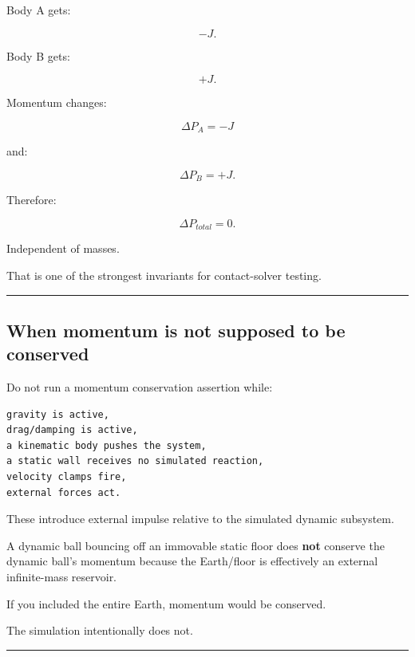 \hypertarget{06-engine-ii-ch039-why-equal-and-opposite-impulse-guarantees-linear-momentum-conservation}{}

Body A gets:

\[
-J.
\]

Body B gets:

\[
+J.
\]

Momentum changes:

\[
\Delta P_A=-J
\]

and:

\[
\Delta P_B=+J.
\]

Therefore:

\[
\Delta P_{total}=0.
\]

Independent of masses.

That is one of the strongest invariants for contact-solver testing.

\begin{center}\rule{0.5\linewidth}{0.5pt}\end{center}

\subsection{When momentum is not supposed to be conserved}\label{06-engine-ii-ch039-when-momentum-is-not-supposed-to-be-conserved}

\hypertarget{06-engine-ii-ch039-when-momentum-is-not-supposed-to-be-conserved}{}

Do not run a momentum conservation assertion while:

\begin{verbatim}
gravity is active,
drag/damping is active,
a kinematic body pushes the system,
a static wall receives no simulated reaction,
velocity clamps fire,
external forces act.
\end{verbatim}

These introduce external impulse relative to the simulated dynamic subsystem.

A dynamic ball bouncing off an immovable static floor does \textbf{not} conserve the dynamic ball's momentum because the Earth/floor is effectively an external infinite-mass reservoir.

If you included the entire Earth, momentum would be conserved.

The simulation intentionally does not.

\begin{center}\rule{0.5\linewidth}{0.5pt}\end{center}

